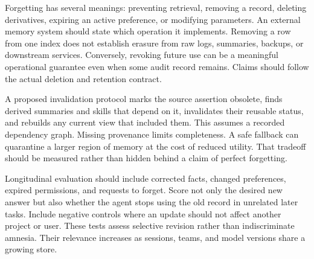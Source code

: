 Forgetting has several meanings: preventing retrieval, removing a record, deleting derivatives, expiring an active preference, or modifying parameters. An external memory system should state which operation it implements. Removing a row from one index does not establish erasure from raw logs, summaries, backups, or downstream services. Conversely, revoking future use can be a meaningful operational guarantee even when some audit record remains. Claims should follow the actual deletion and retention contract.

A proposed invalidation protocol marks the source assertion obsolete, finds derived summaries and skills that depend on it, invalidates their reusable status, and rebuilds any current view that included them. This assumes a recorded dependency graph. Missing provenance limits completeness. A safe fallback can quarantine a larger region of memory at the cost of reduced utility. That tradeoff should be measured rather than hidden behind a claim of perfect forgetting.

Longitudinal evaluation should include corrected facts, changed preferences, expired permissions, and requests to forget. Score not only the desired new answer but also whether the agent stops using the old record in unrelated later tasks. Include negative controls where an update should not affect another project or user. These tests assess selective revision rather than indiscriminate amnesia. Their relevance increases as sessions, teams, and model versions share a growing store.

